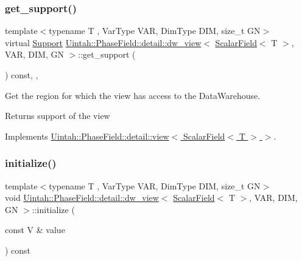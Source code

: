 \subsubsection{\texorpdfstring{get\+\_\+support()}{get\_support()}}
{\footnotesize\ttfamily template$<$typename T , Var\+Type V\+AR, Dim\+Type D\+IM, size\+\_\+t GN$>$ \\
virtual \hyperlink{classUintah_1_1PhaseField_1_1Support}{Support} \hyperlink{classUintah_1_1PhaseField_1_1detail_1_1dw__view}{Uintah\+::\+Phase\+Field\+::detail\+::dw\+\_\+view}$<$ \hyperlink{structUintah_1_1PhaseField_1_1ScalarField}{Scalar\+Field}$<$ T $>$, V\+AR, D\+IM, GN $>$\+::get\+\_\+support (\begin{DoxyParamCaption}{ }\end{DoxyParamCaption}) const\hspace{0.3cm}{\ttfamily [inline]}, {\ttfamily [override]}, {\ttfamily [virtual]}}



Get the region for which the view has access to the Data\+Warehouse. 

\begin{DoxyReturn}{Returns}
support of the view 
\end{DoxyReturn}


Implements \hyperlink{classUintah_1_1PhaseField_1_1detail_1_1view_3_01ScalarField_3_01T_01_4_01_4_a3e14b0c7a57a57707bb33954861ab1c1}{Uintah\+::\+Phase\+Field\+::detail\+::view$<$ Scalar\+Field$<$ T $>$ $>$}.

\mbox{\label{classUintah_1_1PhaseField_1_1detail_1_1dw__view_3_01ScalarField_3_01T_01_4_00_01VAR_00_01DIM_00_01GN_01_4_a29faf454e5cac7b48bece187d8e1b89c}} 
\subsubsection{\texorpdfstring{initialize()}{initialize()}}
{\footnotesize\ttfamily template$<$typename T , Var\+Type V\+AR, Dim\+Type D\+IM, size\+\_\+t GN$>$ \\
void \hyperlink{classUintah_1_1PhaseField_1_1detail_1_1dw__view}{Uintah\+::\+Phase\+Field\+::detail\+::dw\+\_\+view}$<$ \hyperlink{structUintah_1_1PhaseField_1_1ScalarField}{Scalar\+Field}$<$ T $>$, V\+AR, D\+IM, GN $>$\+::initialize (\begin{DoxyParamCaption}\item[{const V \&}]{value }\end{DoxyParamCaption}) const\hspace{0.3cm}{\ttfamily [inline]}}



